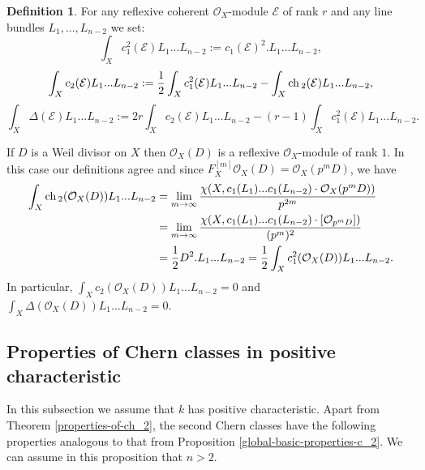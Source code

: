 \documentclass[twoside, 11pt]{article}
\theoremstyle{plain}
\theoremstyle{definition}
\newtheorem{Definition}[Thm]{Definition}
\theoremstyle{remark}
\newcommand{\cE}{{\mathcal E}}
\newcommand{\cO}{{\mathcal O}}
\newcommand{\ch}{{\mathop{\rm ch \, }}}
\begin{document}
\begin{Definition}
For any reflexive coherent $\cO_X$-module $\cE$ of rank $r$ and any line bundles  $ L_1,..., L_{n-2}$ 
we set:
$$\int_X c_1 ^2(\cE) L_1...L_{n-2} :=  c_1 (\cE)^2.L_1...L_{n-2},$$
$$\int _X c_2 (\cE)L_1...L_{n-2}:= \frac{1}{2} \int_X c_1 ^2(\cE) L_1...L_{n-2}-\int _X \ch _2 (\cE)L_1...L_{n-2},$$
$$\int _X \Delta (\cE)L_1...L_{n-2}:=2r \int _X c_2 (\cE) L_1...L_{n-2} -(r-1)\int_X c_1 ^2(\cE) L_1...L_{n-2}.$$
\end{Definition}

\medskip

If $D$ is a Weil divisor on $X$ then $\cO_X(D)$ is a reflexive $\cO_X$-module of rank $1$. In this case our definitions agree and since $F_X^{[m]} \cO_X (D)= \cO_X (p^mD)$, we have
\begin{align*}
\int _X \ch _2 (\cO_X(D))L_1...L_{n-2} &= \lim _{m\to \infty }\frac {  \chi (X, c_1(L_1)...c_1(L_{n-2}) \cdot  \cO_X (p^mD) ) }{p^{2m}}\\
&= \lim _{m\to \infty }\frac {  \chi (X, c_1(L_1)...c_1(L_{n-2}) \cdot  [\cO_{p^mD} ])}{(p^{m})^2} \\
&= \frac{1}{2}D^2.L_1...L_{n-2}=\frac{1}{2}\int_X c_1 ^2(\cO_X(D)) L_1...L_{n-2}.
\end{align*}
In particular,  $\int _X c_2 (\cO_X(D))L_1...L_{n-2}=0$ and $\int _X \Delta (\cO_X(D))L_1...L_{n-2}=0$.


\medskip

\subsection{Properties of Chern classes in positive characteristic}

In this subsection we  assume that $k$ has positive characteristic. Apart from Theorem \ref{properties-of-ch_2}, the second Chern classes have the following properties analogous to that from Proposition \ref{global-basic-properties-c_2}.  We can assume in this proposition that $n>2$.
\end{document}
